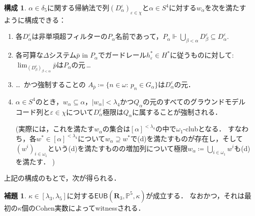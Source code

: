 \documentclass[uplatex,dvipdfmx]{jsarticle}
\newcommand\forces{\Vdash}
\newcommand{\EUB}{\mathsf{EUB}}
\newcommand{\relR}{\mathbf{R}}
\newcommand{\ve}{\varepsilon}
\newcommand{\Pa}{\mathbb{P}^5}
\renewcommand\subset{\subseteq}
\theoremstyle{definition}
\newtheorem{lem}[thm]{補題}
\newtheorem{construction}[thm]{構成}
\begin{document}
	\begin{construction}\label{constr}
		$\alpha\in \delta_5$に関する帰納法で列$(D^\ve_\alpha)_{\ve\in \chi}$と$\alpha\in S^4$に対する$w_\alpha$を次を満たすように構成できる：
		\begin{enumerate}
			\item\label{item:olda} 各$D^\ve_\alpha$は非単項超フィルターの$P_\alpha$名前であって，$P_\alpha \forces \bigcup_{\beta<\alpha}D^\ve_\beta \subset D^\ve_\alpha$.
			\item\label{item:oldb1} 各可算な$\Delta$システム$\bar p$ in $P_\alpha$でガードレール$h^*_\ve\in H^*$に従うものに対して:
			\\
			$\lim_{(D^\ve_\beta)_{\beta<\alpha}}\bar p$は$P_\alpha$の元\,\dots
			\item\label{item:oldb2} \dots\ かつ強制することの
			$A_{\bar p}\coloneq \{n\in\omega:\, p_n\in G_\alpha\}$は$D^\ve_\alpha$の元．
			\item\label{item:oldc} $\alpha\in S^4$のとき，$w_\alpha\subseteq \alpha$，$|w_\alpha|<\lambda_4$かつ$Q_\alpha$の元のすべてのグラウンドモデルコード列と$\ve\in \chi$について$D^\ve_\alpha$極限は$Q_\alpha$に属することが強制される．
			
			(実際には，これを満たす$w_\alpha$の集合は$[\alpha]^{{<}\lambda_4}$の中で$\omega_1$-clubとなる．
			すなわち，各$w^*\in [\alpha]^{{<}\lambda_4}$について$w_\alpha\supseteq w^*$で(d)を満たすものが存在し，そして$(w^i)_{i\in\omega_1}$という(d)を満たすものの増加列について極限$w_\alpha\coloneq \bigcup_{i\in\omega_1}w^i$も(d)を満たす．	)
		\end{enumerate}
	\end{construction}

	上記の構成のもとで，次が得られる．

	\begin{lem}
		$\kappa\in[\lambda_3,\lambda_5]$に対する$\EUB(\relR_3, \Pa,\kappa)$が成立する．
		なおかつ，それは最初の$\kappa$個のCohen実数によってwitnessされる． 
	\end{lem}
	
\end{document}
